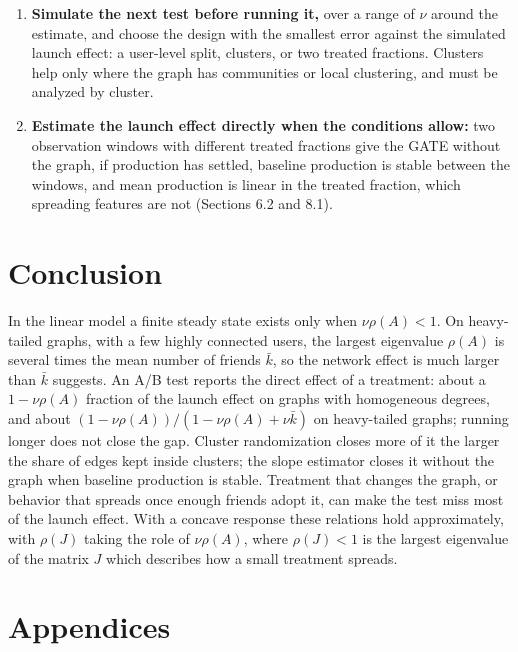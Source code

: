 \documentclass[final,5p,times,twocolumn,number]{elsarticle}
\begin{document}
\begin{enumerate}[itemsep=1pt,topsep=2pt,leftmargin=*]
\item \textbf{Simulate the next test before running it,} over a range of $\nu$  around the estimate, and choose the design with the smallest error against the simulated launch effect: a user-level split, clusters, or two treated fractions. Clusters help only where the graph has communities or local clustering, and must be analyzed by cluster.
\item \textbf{Estimate the launch effect directly when the conditions allow:} two observation windows with different treated fractions give the GATE without the graph, if production has settled, baseline production is stable between the windows, and mean production is linear in the treated fraction, which spreading features are not (Sections 6.2 and 8.1).
\end{enumerate}

\section{Conclusion}

In the linear model a finite steady state exists only when $\nu\rho(A) < 1$. On heavy-tailed graphs, with a few highly connected users, the largest eigenvalue $\rho(A)$  is several times the mean number of friends $\bar k$, so the network effect is much larger than $\bar k$  suggests. An A/B test reports the direct effect of a treatment: about a $1 - \nu\rho(A)$  fraction of the launch effect on graphs with homogeneous degrees, and about $(1 - \nu\rho(A))/(1 - \nu\rho(A) + \nu\bar k)$  on heavy-tailed graphs; running longer does not close the gap. Cluster randomization closes more of it the larger the share of edges kept inside clusters; the slope estimator closes it without the graph when baseline production is stable. Treatment that changes the graph, or behavior that spreads once enough friends adopt it, can make the test miss most of the launch effect. With a concave response these relations hold approximately, with $\rho(J)$  taking the role of $\nu\rho(A)$, where $\rho(J) < 1$  is the largest eigenvalue of the matrix $J$  which describes how a small treatment spreads.


\flushcolsend
\clearpage
\appendix
\renewcommand{\thefigure}{\arabic{figure}}\renewcommand{\thetable}{\arabic{table}}
\section*{Appendices}
\footnotesize
\renewcommand{\dbltopfraction}{0.95}\renewcommand{\dblfloatpagefraction}{0.8}\setcounter{dbltopnumber}{3}\setlength{\dblfloatsep}{10pt plus 2pt minus 2pt}
\end{document}
